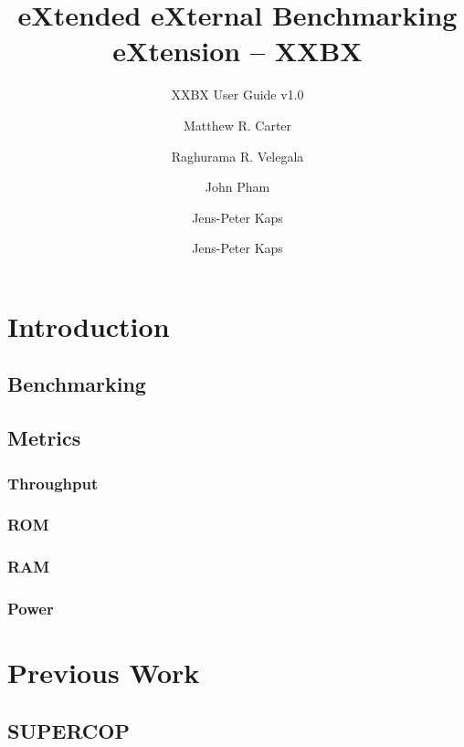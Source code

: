 \documentclass[twoside,11pt]{cergdoc}
\begin{document}
\title{eXtended eXternal Benchmarking eXtension -- XXBX}
\subtitle{XXBX User Guide v1.0}
\author{Matthew R. Carter \and Raghurama R. Velegala \and John Pham \and Jens-Peter Kaps}
\author{Jens-Peter Kaps}

\maketitle

\tableofcontents

\chapter{Introduction}
  \section{Benchmarking}
  \section{Metrics}
    \subsection{Throughput}
    \subsection{ROM}
    \subsection{RAM}
    \subsection{Power}
\chapter{Previous Work}
  \section{SUPERCOP}
\end{document}
